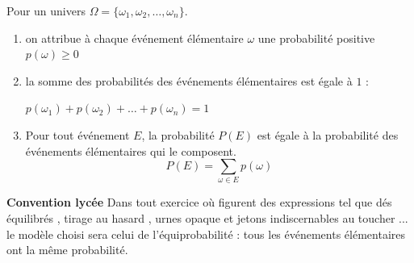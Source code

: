 \documentclass[main.tex]{subfiles}
\begin{document}
\begin{definition} Pour un univers $\Omega=\{ \omega_1, \omega_2, \ldots , \omega_n\}$.
	\begin{enumerate}[label=\alph*),leftmargin=*]
		\item on attribue à chaque événement élémentaire $\omega$ une probabilité positive $p(\omega)\geqslant 0$
		\item la somme des probabilités des événements élémentaires est égale à $1$ :
		
		$
		p(\omega_1)+p(\omega_2) +\ldots+p(\omega_n)=1
		$ 
		\item Pour tout événement $E$, la probabilité $P(E)$ est égale à la probabilité des événements élémentaires qui le composent.
		$$P(E)=\sum_{\omega \in E} p(\omega)$$
	\end{enumerate}	 
\end{definition}  

\newpage 
\textbf{Convention lycée} Dans tout exercice où figurent des expressions tel que \og dés équilibrés \fg{}, \og tirage au hasard \fg{}, \og urnes opaque et jetons indiscernables au toucher \fg{}... le modèle choisi sera celui de l’équiprobabilité : tous les événements élémentaires ont la même probabilité.
\end{document}

